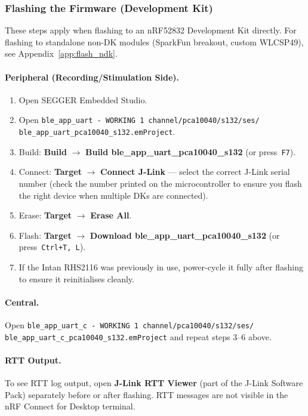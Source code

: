 \subsubsection{Flashing the Firmware (Development Kit)}

These steps apply when flashing to an nRF52832 Development Kit directly.
For flashing to standalone non-DK modules (SparkFun breakout, custom
WLCSP49), see Appendix~\ref{app:flash_ndk}.

\paragraph{Peripheral (Recording/Stimulation Side).}
\begin{enumerate}
    \item Open SEGGER Embedded Studio.
    \item Open \texttt{ble\_app\_uart - WORKING 1 channel/pca10040/s132/ses/\\
          ble\_app\_uart\_pca10040\_s132.emProject}.
    \item Build: \textbf{Build} $\to$ \textbf{Build ble\_app\_uart\_pca10040\_s132}
          (or press~\texttt{F7}).
    \item Connect: \textbf{Target} $\to$ \textbf{Connect J-Link} --- select the
          correct J-Link serial number (check the number printed on the
          microcontroller to ensure you flash the right device when multiple
          DKs are connected).
    \item Erase: \textbf{Target} $\to$ \textbf{Erase All}.
    \item Flash: \textbf{Target} $\to$ \textbf{Download ble\_app\_uart\_pca10040\_s132}
          (or press~\texttt{Ctrl+T, L}).
    \item If the Intan RHS2116 was previously in use, power-cycle it fully
          after flashing to ensure it reinitialises cleanly.
\end{enumerate}

\paragraph{Central.}
Open \texttt{ble\_app\_uart\_c - WORKING 1 channel/pca10040/s132/ses/\\
ble\_app\_uart\_c\_pca10040\_s132.emProject} and repeat steps 3--6 above.

\paragraph{RTT Output.}
To see RTT log output, open \textbf{J-Link RTT Viewer} (part of the J-Link
Software Pack) separately before or after flashing. RTT messages are not
visible in the nRF Connect for Desktop terminal.

